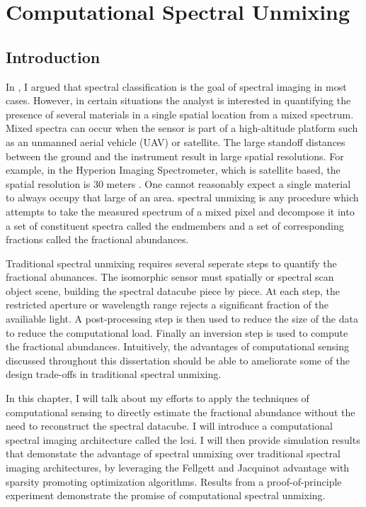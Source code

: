 \chapter{Computational Spectral Unmixing}\label{chap:Csu}

\section{Introduction}

In , I argued that spectral classification is the goal of spectral imaging in most cases. However, in certain situations the analyst is interested in quantifying the presence of several materials in a single spatial location from a \gls{mixed spectrum}. Mixed spectra can occur when the sensor is part of a high-altitude platform such as an unmanned aerial vehicle (UAV) or satellite. The large standoff distances between the ground and the instrument result in large spatial resolutions. For example, in the Hyperion Imaging Spectrometer, which is satellite based, the spatial resolution is 30 meters \cite{folkman2001eo}. One cannot reasonably expect a single material to always occupy that large of an area. \Gls{spectral unmixing} is any procedure which attempts to take the measured spectrum of a mixed pixel and decompose it into a set of constituent spectra called the \glspl{endmember} and a set of corresponding fractions called the \glspl{fractional abundance}. 

Traditional spectral unmixing requires several seperate steps to quantify the fractional abunances. The isomorphic sensor must spatially or spectral scan object scene, building the spectral datacube piece by piece. At each step, the restricted aperture or wavelength range rejects a significant fraction of the availiable light. A post-processing step is then used to reduce the size of the data to reduce the computational load. Finally an inversion step is used to compute the fractional abundances. Intuitively, the advantages of computational sensing discussed throughout this dissertation should be able to ameliorate some of the design trade-offs in traditional spectral unmixing.

In this chapter, I will talk about my efforts to apply the techniques of computational sensing to directly estimate the \gls{fractional abundance} without the need to reconstruct the spectral datacube. I will introduce a computational spectral imaging architecture called the \gls{lcsi}. I will then provide simulation results that demonstate the advantage of spectral unmixing over traditional spectral imaging architectures, by leveraging the Fellgett and Jacquinot advantage with sparsity promoting optimization algorithms. Results from a proof-of-principle experiment demonstrate the promise of computational spectral unmixing. 

